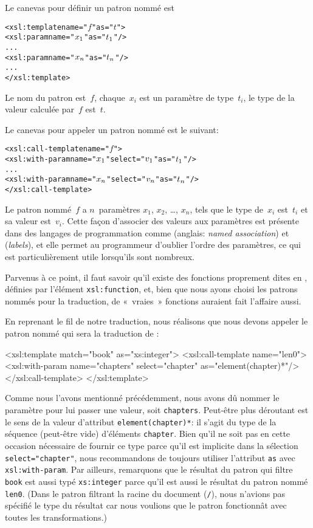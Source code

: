 Le canevas pour définir un patron nommé est
\begin{alltt}
\small<xsl:template name="\(f\)" as="\(t\)">
  <xsl:param name="\(x\sb{1}\)" as="\(t\sb{1}\)"/>
  ...
  <xsl:param name="\(x\sb{n}\)" as="\(t\sb{n}\)"/>
  ...
</xsl:template>
\end{alltt}
Le nom du patron est~\(f\), chaque~\(x_i\) est un paramètre de
type~\(t_i\), le type de la valeur calculée par~\(f\) est~\(t\).

Le canevas pour appeler un patron nommé est le suivant:
\begin{alltt}
\small<xsl:call-template name="\(f\)">
  <xsl:with-param name="\(x\sb{1}\)" select="\(v\sb{1}\)" as="\(t\sb{1}\)"/>
  ...
  <xsl:with-param name="\(x\sb{n}\)" select="\(v\sb{n}\)" as="\(t\sb{n}\)"/>
</xsl:call-template>
\end{alltt}
Le patron nommé~\(f\) a \(n\)~paramètres \(x_1\), \(x_2\), \ldots,
\(x_n\), tels que le type de~\(x_i\) est~\(t_i\) et sa valeur
est~\(v_i\). Cette façon d'associer des valeurs aux paramètres est
présente dans des langages de programmation comme \Ada (anglais:
\emph{named association}) et \OCaml (\emph{labels}), et elle permet au
programmeur d'oublier l'ordre des paramètres, ce qui est
particulièrement utile lorsqu'ils sont nombreux.

Parvenus à ce point, il faut savoir qu'il existe des fonctions
proprement dites en \XSLT, définies par l'élément
\texttt{xsl:function}, et, bien que nous ayons choisi les patrons
nommés pour la traduction, de «~vraies~» fonctions \XSLT auraient fait
l'affaire aussi.

En reprenant le fil de notre traduction, nous réalisons que nous
devons appeler le patron nommé qui sera la traduction de :
\begin{sverb}
  <xsl:template match="book" as="xs:integer">
    <xsl:call-template name="len0">
      <xsl:with-param name="chapters" select="chapter"
                      as="element(chapter)*"/>
    </xsl:call-template>
  </xsl:template>
\end{sverb}
Comme nous l'avons mentionné précédemment, nous avons dû nommer le
paramètre pour lui passer une valeur, soit
\texttt{chapters}. Peut-être plus déroutant est le sens de la valeur
d'attribut \texttt{element(chapter)*}: il s'agit du type de la
séquence (peut-être vide) d'éléments \texttt{chapter}. Bien qu'il ne
soit pas en cette occasion nécessaire de fournir ce type parce qu'il
est implicite dans la sélection \texttt{select="chapter"}, nous
recommandons de toujours utiliser l'attribut \texttt{as} avec
\texttt{xsl:with-param}. Par ailleurs, remarquons que le résultat du
patron qui filtre \texttt{book} est aussi typé \texttt{xs:integer}
parce qu'il est aussi le résultat du patron nommé \texttt{len0}. (Dans
le patron filtrant la racine du document (\texttt{/}), nous n'avions
pas spécifié le type du résultat car nous voulions que le patron
fonctionnât avec toutes les transformations.)

